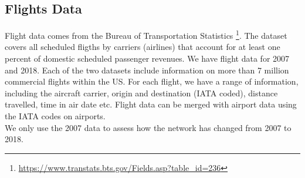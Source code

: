 
\subsection{Flights Data}
\label{subsec:Flight_Data}
Flight data comes from the Bureau of Transportation Statistics \footnote{\url{https://www.transtats.bts.gov/Fields.asp?table_id=236}}. The dataset covers all scheduled fligths by carriers (airlines) that account for at least one percent of domestic scheduled passenger revenues. We have flight data for 2007 and 2018. Each of the two datasets include information on more than 7 million commercial flights within the US. For each flight, we have a range of information, including the aircraft carrier, origin and destination (IATA coded), distance travelled, time in air date etc. Flight data can be merged with airport data using the IATA codes on airports. \medskip\\
We only use the 2007 data to assess how the network has changed from 2007 to 2018. 





